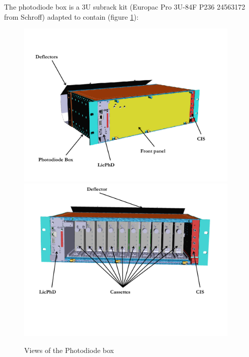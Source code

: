 

The photodiode box is a 3U subrack kit (Europac Pro 3U-84F P236 24563172 from Schroff) adapted to contain (figure \ref{fig:lasphotodiodebox}):

\begin{figure}[htbp]
\centering
\includegraphics[height=8cm]{figures/Photodiodebox.pdf}
\includegraphics[height=8cm]{figures/Photodiodebox2.pdf}
\caption{Views of the Photodiode box}\label{fig:lasphotodiodebox}
\end{figure}


